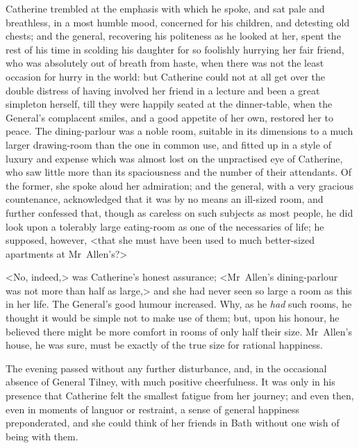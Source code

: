 Catherine trembled at the emphasis with which he spoke, and sat pale and breathless, in a most humble mood, concerned for his children, and detesting old chests; and the general, recovering his politeness as he looked at her, spent the rest of his time in scolding his daughter for so foolishly hurrying her fair friend, who was absolutely out of breath from haste, when there was not the least occasion for hurry in the world: but Catherine could not at all get over the double distress of having involved her friend in a lecture and been a great simpleton herself, till they were happily seated at the dinner-table, when the General's complacent smiles, and a good appetite of her own, restored her to peace. The dining-parlour was a noble room, suitable in its dimensions to a much larger drawing-room than the one in common use, and fitted up in a style of luxury and expense which was almost lost on the unpractised eye of Catherine, who saw little more than its spaciousness and the number of their attendants. Of the former, she spoke aloud her admiration; and the general, with a very gracious countenance, acknowledged that it was by no means an ill-sized room, and further confessed that, though as careless on such subjects as most people, he did look upon a tolerably large eating-room as one of the necessaries of life; he supposed, however, <that she must have been used to much better-sized apartments at Mr~Allen's?> 

 <No, indeed,> was Catherine's honest assurance; <Mr~Allen's dining-parlour was not more than half as large,> and she had never seen so large a room as this in her life. The General's good humour increased. Why, as he \textit{had} such rooms, he thought it would be simple not to make use of them; but, upon his honour, he believed there might be more comfort in rooms of only half their size. Mr~Allen's house, he was sure, must be exactly of the true size for rational happiness. 

 The evening passed without any further disturbance, and, in the occasional absence of General Tilney, with much positive cheerfulness. It was only in his presence that Catherine felt the smallest fatigue from her journey; and even then, even in moments of languor or restraint, a sense of general happiness preponderated, and she could think of her friends in Bath without one wish of being with them. 


